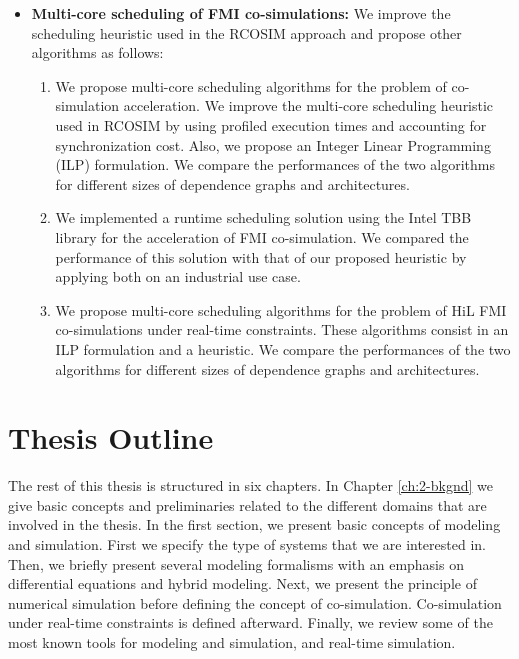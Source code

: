 \begin{itemize}
\begin{enumerate}
\setcounter{enumTemp}{\theenumi}

\end{enumerate}

\item \textbf{Multi-core scheduling of FMI co-simulations:} We improve the scheduling heuristic used in the RCOSIM approach and propose other algorithms as follows:

\begin{enumerate}

\setcounter{enumi}{\theenumTemp}

\item We propose multi-core scheduling algorithms for the problem of co-simulation acceleration. We improve the multi-core scheduling heuristic used in RCOSIM by using profiled execution times and accounting for synchronization cost. Also, we propose an Integer Linear Programming (ILP) formulation. We compare the performances of the two algorithms for different sizes of dependence graphs and architectures.

\item We implemented a runtime scheduling solution using the Intel TBB library \cite{reinders:2007} for the acceleration of FMI co-simulation. We compared the performance of this solution with that of our proposed heuristic by applying both on an industrial use case.

\item We propose multi-core scheduling algorithms for the problem of HiL FMI co-simulations under real-time constraints. These algorithms consist in an ILP formulation and a heuristic. We compare the performances of the two algorithms for different sizes of dependence graphs and architectures.   

\end{enumerate}

\end{itemize}

\section{Thesis Outline}

The rest of this thesis is structured in six chapters. In Chapter \ref{ch:2-bkgnd} we give basic concepts and preliminaries related to the different domains that are involved in the thesis. In the first section, we present basic concepts of modeling and simulation. First we specify the type of systems that we are interested in. Then, we briefly present several modeling formalisms with an emphasis on differential equations and hybrid modeling. Next, we present the principle of numerical simulation before defining the concept of co-simulation. Co-simulation under real-time constraints is defined afterward. Finally, we review some of the most known tools for modeling and simulation, and real-time simulation.

